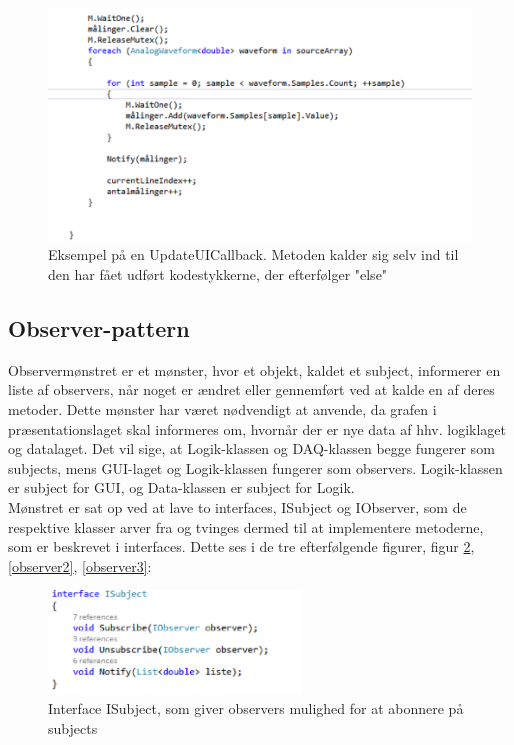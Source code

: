 \begin{figure}[H]
	\centering
	\includegraphics[width=1.1\textwidth]{Figurer/SoftwareImplementering/mutex}
	\caption{Eksempel på en UpdateUICallback. Metoden kalder sig selv ind til den har fået udført kodestykkerne, der efterfølger "else"\ }
	\label{mutex}
\end{figure}


\subsection{Observer-pattern}
Observermønstret er et mønster, hvor et objekt, kaldet et subject, informerer en liste af observers, når noget er ændret eller gennemført ved at kalde en af deres metoder. Dette mønster har været nødvendigt at anvende, da grafen i præsentationslaget skal informeres om, hvornår der er nye data af hhv. logiklaget og datalaget. Det vil sige, at Logik-klassen og DAQ-klassen begge fungerer som subjects, mens GUI-laget og Logik-klassen fungerer som observers. Logik-klassen er subject for GUI, og Data-klassen er subject for Logik.\\
Mønstret er sat op ved at lave to interfaces, ISubject og IObserver, som de respektive klasser arver fra og tvinges dermed til at implementere metoderne, som er beskrevet i interfaces. Dette ses i de tre efterfølgende figurer, figur \ref{observer1},\ref{observer2}, \ref{observer3}:

\begin{figure}[H]
	\centering
	\includegraphics[width=0.6\textwidth]{Figurer/SoftwareImplementering/observer1}
	\caption{Interface ISubject, som giver observers mulighed for at abonnere på subjects}
	\label{observer1}
\end{figure}

